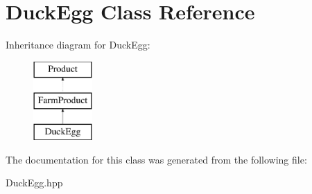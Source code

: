 \hypertarget{class_duck_egg}{}\section{Duck\+Egg Class Reference}
\label{class_duck_egg}
Inheritance diagram for Duck\+Egg\+:\begin{figure}[H]
\begin{center}
\leavevmode
\includegraphics[height=3.000000cm]{class_duck_egg}
\end{center}
\end{figure}


The documentation for this class was generated from the following file\+:\begin{DoxyCompactItemize}
\item 
Duck\+Egg.\+hpp\end{DoxyCompactItemize}
